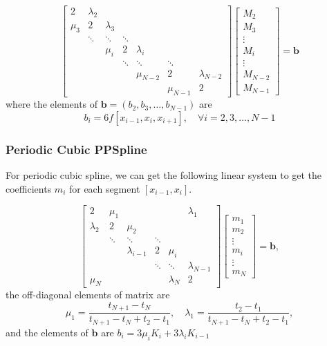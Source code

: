 \documentclass[a4paper]{article}
\begin{document}
\[
\begin{bmatrix}
2 & \lambda_2 &  &  &  &  \\
\mu_3 & 2 & \lambda_3 &  &  &  \\
 & \ddots & \ddots & \ddots &  &  \\
 &  & \mu_i & 2 & \lambda_i &  \\
 &  &  & \ddots & \ddots & \ddots \\
 &  &  &  & \mu_{N-2} & 2 & \lambda_{N-2} \\
 &  &  &  &  & \mu_{N-1} & 2
\end{bmatrix}
\begin{bmatrix}
M_2 \\
M_3 \\
\vdots \\
M_i \\
\vdots \\
M_{N-2} \\
M_{N-1}
\end{bmatrix}
=
\mathbf{b}
\]
where the elements of $\mathbf{b} = (b_2, b_3, \dots, b_{N-1})$ are
\[b_i = 6 f[x_{i-1},x_i,x_{i+1}], \quad \forall i = 2,3,\ldots, N-1  \]
\subsubsection{Periodic Cubic PPSpline}
For periodic cubic spline, we can get the following linear system to get the coefficients $m_i$ for each segment $[x_{i-1}, x_i]$.

\[
\begin{bmatrix}
2 & \mu_1 &  &  &  & \lambda_1 \\
\lambda_2 & 2 & \mu_2 &  &  &  \\
 & \ddots & \ddots & \ddots &  &  \\
 &  & \lambda_{i-1} & 2 & \mu_i &  \\
 &  &  & \ddots & \ddots & \lambda_{N-1} \\
\mu_N &  &  &  & \lambda_N & 2
\end{bmatrix}
\begin{bmatrix}
m_1 \\
m_2 \\
\vdots \\
m_i \\
\vdots \\
m_N
\end{bmatrix}
=
\mathbf{b},
\]
the off-diagonal elements of matrix are
\[
\mu_1 = \frac{t_{N+1} - t_N}{t_{N+1} - t_N + t_2 - t_1}, \quad
\lambda_1 = \frac{t_2 - t_1}{t_{N+1} - t_N + t_2 - t_1},
\]
and the elements of $\mathbf{b}$ are $b_i = 3\mu_i K_i + 3\lambda_i K_{i-1}$ 
\end{document}

